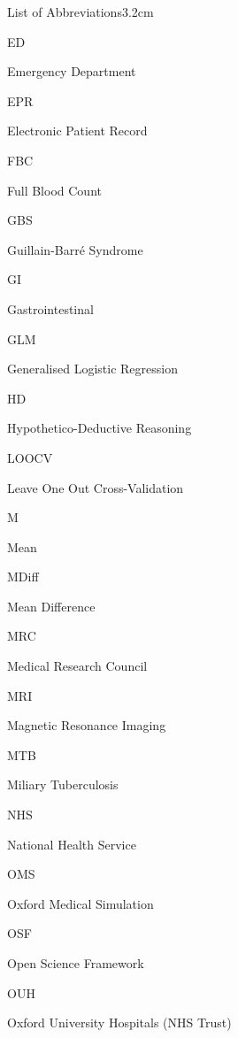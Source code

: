 \documentclass[a4paper, nobind]{templates/ociamthesis}
\begin{document}
\begin{romanpages}
\begin{mclistof}{List of Abbreviations}{3.2cm}
\item[ED]

Emergency Department

\item[EPR]

Electronic Patient Record

\item[FBC]

Full Blood Count

\item[GBS]

Guillain-Barré Syndrome

\item[GI]

Gastrointestinal

\item[GLM]

Generalised Logistic Regression

\item[HD]

Hypothetico-Deductive Reasoning

\item[LOOCV]

Leave One Out Cross-Validation

\item[M]

Mean

\item[MDiff]

Mean Difference

\item[MRC]

Medical Research Council

\item[MRI]

Magnetic Resonance Imaging

\item[MTB]

Miliary Tuberculosis

\item[NHS]

National Health Service

\item[OMS]

Oxford Medical Simulation

\item[OSF]

Open Science Framework

\item[OUH]

Oxford University Hospitals (NHS Trust)


\end{mclistof}
\end{romanpages}
\end{document}
